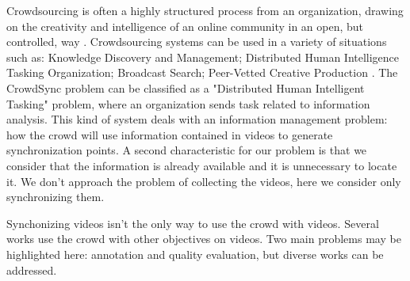 
Crowdsourcing is often a highly structured process from an organization, drawing on the creativity and intelligence of an online community in an open, but controlled, way \cite{brabham2014crowdsourcing}. Crowdsourcing systems can be used in a variety of situations such as: Knowledge Discovery and Management; Distributed Human Intelligence Tasking Organization; Broadcast Search; Peer-Vetted Creative Production \cite{brabham2014crowdsourcing}. The CrowdSync problem can be classified as a "Distributed Human Intelligent Tasking" problem, where an organization sends task related to information analysis. This kind of system deals with an information management problem: how the crowd will use information contained in videos to generate synchronization points. A second characteristic for our problem is that we consider that the information is already available and it is unnecessary to locate it. We don't approach the problem of collecting the videos, here we consider only synchronizing them.

Synchonizing videos isn't the only way to use the crowd with videos. Several works use the crowd with other objectives on videos. Two main problems may be highlighted here: annotation and quality evaluation, but diverse works can be addressed.



